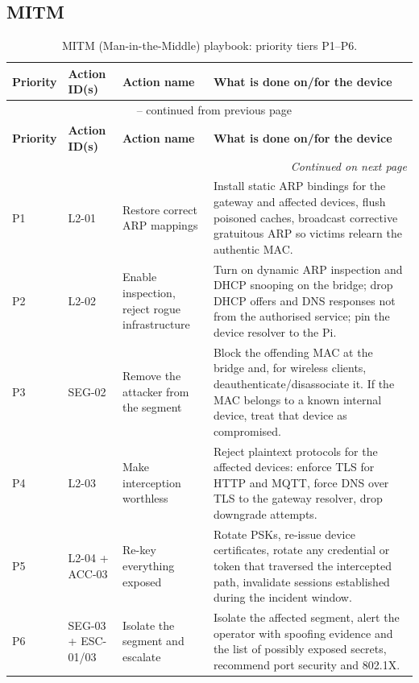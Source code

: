 \subsection{MITM}

\begin{longtable}{|p{}|p{}|p{}|p{}|}
\caption{MITM (Man-in-the-Middle) playbook: priority tiers P1--P6.}
\label{tab:playbook_mitm}\\
\hline
\textbf{Priority} & \textbf{Action ID(s)} & \textbf{Action name} & \textbf{What is done on/for the device} \\
\hline
\endfirsthead
\multicolumn{4}{c}{\tablename\ \thetable{} -- continued from previous page}\\
\hline
\textbf{Priority} & \textbf{Action ID(s)} & \textbf{Action name} & \textbf{What is done on/for the device} \\
\hline
\endhead
\hline \multicolumn{4}{r}{\textit{Continued on next page}}\\
\endfoot
\hline
\endlastfoot
P1 & L2-01 & Restore correct ARP mappings & Install static ARP bindings for the gateway and affected devices, flush poisoned caches, broadcast corrective gratuitous ARP so victims relearn the authentic MAC. \\
\hline
P2 & L2-02 & Enable inspection, reject rogue infrastructure & Turn on dynamic ARP inspection and DHCP snooping on the bridge; drop DHCP offers and DNS responses not from the authorised service; pin the device resolver to the Pi. \\
\hline
P3 & SEG-02 & Remove the attacker from the segment & Block the offending MAC at the bridge and, for wireless clients, deauthenticate/disassociate it. If the MAC belongs to a known internal device, treat that device as compromised. \\
\hline
P4 & L2-03 & Make interception worthless & Reject plaintext protocols for the affected devices: enforce TLS for HTTP and MQTT, force DNS over TLS to the gateway resolver, drop downgrade attempts. \\
\hline
P5 & L2-04 + ACC-03 & Re-key everything exposed & Rotate PSKs, re-issue device certificates, rotate any credential or token that traversed the intercepted path, invalidate sessions established during the incident window. \\
\hline
P6 & SEG-03 + ESC-01/03 & Isolate the segment and escalate & Isolate the affected segment, alert the operator with spoofing evidence and the list of possibly exposed secrets, recommend port security and 802.1X. \\
\hline
\end{longtable}

